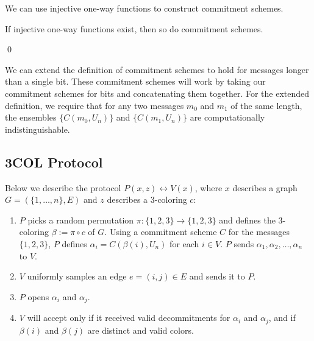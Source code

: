We can use injective one-way functions to construct commitment schemes.

\begin{theorem}
If injective one-way functions exist, then so do commitment schemes.
\end{theorem}
\qed

\medskip
We can extend the definition of commitment schemes to hold for messages longer than a single bit. These commitment schemes will work by taking our commitment schemes for bits and concatenating them together. For the extended definition, we require that for any two messages $m_0$ and $m_1$ of the same length, the ensembles $\{ C(m_0, U_n) \}$ and $\{ C(m_1, U_n) \}$ are computationally indistinguishable.

\subsection{3COL Protocol}

Below we describe the protocol $P(x,z) \leftrightarrow V(x)$, where $x$ describes a graph $G = (\{1, \ldots, n \}, E)$ and $z$ describes a 3-coloring $c$:

\begin{enumerate}
\item $P$ picks a random permutation $\pi : \{ 1, 2, 3 \} \to \{ 1, 2, 3 \}$ and defines the 3-coloring $\beta := \pi \circ c$ of $G$. Using a commitment scheme $C$ for the messages $\{ 1, 2, 3 \}$, $P$ defines $\alpha_i = C(\beta(i), U_n)$ for each $i \in V$. $P$ sends $\alpha_1, \alpha_2, \ldots, \alpha_n$ to $V$.

\item $V$ uniformly samples an edge $e = (i, j) \in E$ and sends it to $P$.

\item $P$ opens $\alpha_i$ and $\alpha_j$.

\item $V$ will accept only if it received valid decommitments for $\alpha_i$ and $\alpha_j$, and if $\beta(i)$ and $\beta(j)$ are distinct and valid colors.

\end{enumerate}

